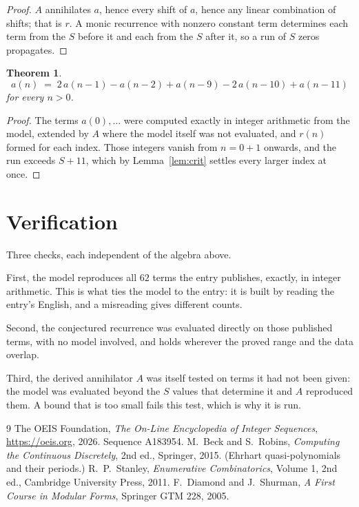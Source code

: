 \documentclass[11pt,a4paper]{article}
\theoremstyle{plain}
\newtheorem{theorem}{Theorem}
\theoremstyle{definition}
\begin{document}
\begin{proof}
$A$ annihilates $a$, hence every shift of $a$, hence any linear combination of shifts; that is
$r$. A monic recurrence with nonzero constant term determines each term from the $S$ before it
and each from the $S$ after it, so a run of $S$ zeros propagates.
\end{proof}

\begin{theorem}
\[
a(n)\;=\;2\,a(n-1) - a(n-2) + a(n-9) - 2\,a(n-10) + a(n-11)
\]
for every $n>0$.
\end{theorem}

\begin{proof}
The terms $a(0),\dots$ were computed exactly in integer arithmetic from the model, extended by
$A$ where the model itself was not evaluated, and $r(n)$ formed for each index. Those integers
vanish from $n=0+1$ onwards, and the run exceeds $S+11$, which by
Lemma~\ref{lem:crit} settles every larger index at once.
\end{proof}

\section{Verification}

Three checks, each independent of the algebra above.

First, the model reproduces all $62$ terms the entry publishes, exactly, in integer
arithmetic. This is what ties the model to the entry: it is built by reading the entry's
English, and a misreading gives different counts.

Second, the conjectured recurrence was evaluated directly on those published terms, with no
model involved, and holds wherever the proved range and the data overlap.

Third, the derived annihilator $A$ was itself tested on terms it had not been given: the model
was evaluated beyond the $S$ values that determine it and $A$ reproduced them. A bound that is
too small fails this test, which is why it is run.

\begin{thebibliography}{9}
 The OEIS Foundation, \emph{The On-Line Encyclopedia of Integer
Sequences}, \url{https://oeis.org}, 2026. Sequence A183954.
 M.~Beck and S.~Robins, \emph{Computing the Continuous Discretely},
2nd ed., Springer, 2015. (Ehrhart quasi-polynomials and their periods.)
 R.~P.~Stanley, \emph{Enumerative Combinatorics}, Volume 1, 2nd ed.,
Cambridge University Press, 2011.
 F.~Diamond and J.~Shurman, \emph{A First Course in Modular Forms},
Springer GTM 228, 2005.
\end{thebibliography}
\end{document}
